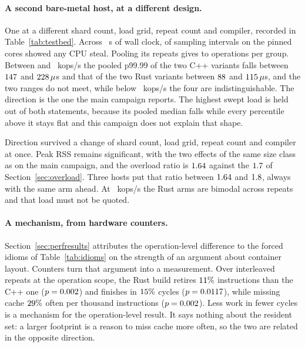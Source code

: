 \documentclass[english,oneside,a4paper,censored,csm,software-track-2020]{HYthesisML}
\begin{document}
\begin{appendices}
\paragraph{A second bare-metal host, at a different design.}
One \BmCpu{} at a different shard count, load grid, repeat count and compiler, recorded in
Table~\ref{tab:testbed}. Across \BmStealWindow{}~s of wall clock, \BmStealWithSteal{} of
\BmStealIntervals{} sampling intervals on the \BmStealCores{} pinned cores showed any CPU steal.
Pooling its repeats gives \BmPoolSamplesMin{} to \BmPoolSamplesMax{} operations per group. Between
\BmFarTailSepLoad{} and \BmFarTailSepHi{}~kops/s the pooled p99.99 of the two C++ variants falls
between $147$ and $228\,\mu$s and that of the two Rust variants between
$88$ and $115\,\mu$s, and the two ranges do not meet, while below
\BmFarTailSepLoad{}~kops/s the four are indistinguishable. The direction is the one the main
campaign reports. The highest swept load is held out of both statements, because its pooled median
falls while every percentile above it stays flat and this campaign does not explain that shape.

Direction survived a change of shard count, load grid, repeat count and compiler at once. Peak RSS
remains significant, with the two effects of the same size class as on the main campaign, and the
overload ratio is $1.64$ against the $1.7$ of
Section~\ref{sec:overload}. Three hosts put that ratio between $1.64$ and
$1.8$, always with the same arm ahead. At \BmMetastableLoad{}~kops/s the Rust
arms are bimodal across repeats and that load must not be quoted.

\paragraph{A mechanism, from hardware counters.}
Section~\ref{sec:perfresults} attributes the operation-level difference to the forced idioms of
Table~\ref{tab:idioms} on the strength of an argument about container layout. Counters turn that
argument into a measurement. Over \BmCounterRepeats{} interleaved repeats at the operation
scope, the Rust build retires $11\%$ \BmInstrDeltaDir{} instructions than the C++ one
($p=0.002$) and finishes in $15\%$ \BmCycleDeltaDir{} cycles
($p=0.0117$), while missing cache $29\%$ \BmMissDeltaDir{} often per thousand
instructions ($p=0.002$). Less work in fewer cycles is a mechanism for the
operation-level result. It says nothing about the resident set: a larger footprint is a reason
to miss cache more often, so the two are related in the opposite direction.


\end{appendices}
\end{document}

